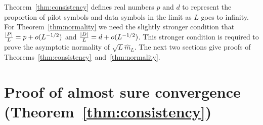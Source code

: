 \documentclass[draftcls, onecolumn, 11pt]{IEEEtran}
\begin{document}
Theorem~\ref{thm:consistency} defines real numbers $p$ and $d$ to represent the proportion of pilot symbols and data symbols in the limit as $L$ goes to infinity.  For Theorem~\ref{thm:normality} we need the slightly stronger condition that $\frac{{\left\vert P \right\vert}}{L} = p + o(L^{-1/2})$ and $\frac{{\left\vert D \right\vert}}{L} = d + o(L^{-1/2})$.  
This stronger condition is required to prove the asymptotic normality of $\sqrt{L}\hat{m}_L$.  The next two sections give proofs of Theorems~\ref{thm:consistency}~and~\ref{thm:normality}.  %




\section{Proof of almost sure convergence (Theorem~\ref{thm:consistency}) } \label{sec:proof-almost-sure}
\end{document}
